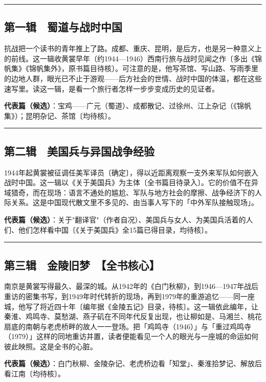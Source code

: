\documentclass[UTF8,fontset=none,zihao=-4,a4paper]{ctexart}
\begin{document}
\medskip\hrule\medskip

\subsection{第一辑　蜀道与战时中国}


抗战把一个读书的青年推上了路。成都、重庆、昆明，是后方，也是另一种意义上的前线。这一辑收黄裳早年（约1944—1946）西南行旅与战时见闻之作〔多出《锦帆集》《锦帆集外》，原书篇目待核〕。可注意的是，他写茶馆、写山路、写雨季里的边地人群，眼光已不止于游观——后方社会的世情、战时中国的体温，都在这些速写里。读这一辑，是看一个旅行者怎样一步步变成历史的见证者。


\textbf{代表篇（候选）}：宝鸡——广元（蜀道）、成都散记、过徐州、江上杂记（《锦帆集》）；昆明杂记、茶馆〔均待核〕。


\medskip\hrule\medskip

\subsection{第二辑　美国兵与异国战争经验}


1944年起黄裳被征调任美军译员〔确定〕，得以近距离观察一支外来军队如何嵌入战时中国。这一辑以《关于美国兵》为主体〔全书篇目待录入〕。它的价值不在异域猎奇，而在现场：语言不通处的尴尬、军队与地方社会的摩擦、战争经济下的人际关系。这是中国现代散文里不多见的、由当事人写下的「中外军队接触现场」。


\textbf{代表篇（候选）}：关于"翻译官"（作者自况）、美国兵与女人、为美国兵活着的人们、他们怎样看中国〔《关于美国兵》全15篇已得目录，均待核〕。


\medskip\hrule\medskip

\subsection{第三辑　金陵旧梦　【全书核心】}


南京是黄裳写得最久、最深的城。从1942年的《白门秋柳》，到1946—1947年战后重访的密集书写，到1949年时代转折的现场，再到1979年的重游追忆——同一座城，他写了将近四十年〔编年据《金陵五记》目录，待核〕。这一辑依此编年，让秦淮、鸡鸣寺、莫愁湖、燕子矶在不同年代反复出现，也让柳如是、马湘兰、桃花扇底的南朝与老虎桥畔的故人一一登场。把「鸡鸣寺（1946）」与「重过鸡鸣寺（1979）」这样的同地重访并置，读者便能看见一个人的眼光与一座城的命运如何彼此映照。这是全书的心脏。


\textbf{代表篇（候选）}：白门秋柳、金陵杂记、老虎桥边看「知堂」、秦淮拾梦记、解放后看江南〔均待核〕。
\end{document}
